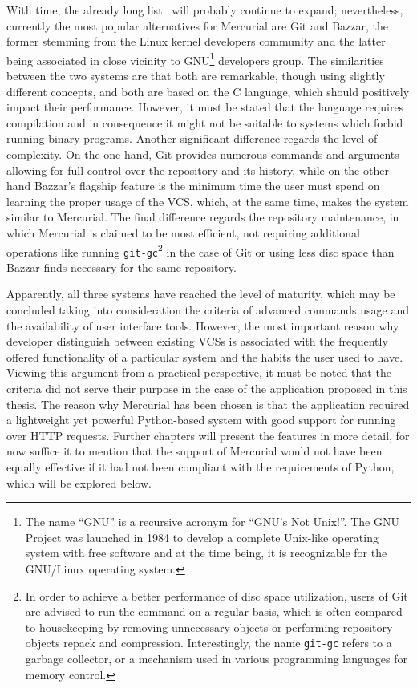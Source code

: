 With time, the already long list~\cite{wiki_dvcs_list} will probably continue to expand; nevertheless, currently the most popular alternatives for Mercurial are Git and Bazzar, the former stemming from the Linux kernel developers community and the latter being associated in close vicinity to GNU\footnote{The name “GNU” is a recursive acronym for “GNU's Not Unix!”. The GNU Project was launched in 1984 to develop a complete Unix-like operating system with free software and at the time being, it is recognizable for the GNU/Linux operating system.} developers group. The similarities between the two systems are that both are remarkable, though using slightly different concepts, and both are based on the C language, which should positively impact their performance. However, it must be stated that the language requires compilation and in consequence it might not be suitable to systems which forbid running binary programs. Another significant difference regards the level of complexity. On the one hand, Git provides numerous commands and arguments allowing for full control over the repository and its history, while on the other hand Bazzar's flagship feature is the minimum time the user must spend on learning the proper usage of the VCS, which, at the same time, makes the system similar to Mercurial. The final difference regards the repository maintenance, in which Mercurial is claimed to be most efficient, not requiring additional operations like running \texttt{git-gc}\footnote{In order to achieve a better performance of disc space utilization, users of Git are advised to run the command on a regular basis, which is often compared to housekeeping by removing unnecessary objects or performing repository objects repack and compression. Interestingly, the name \texttt{git-gc} refers to a garbage collector, or a mechanism used in various programming languages for memory control.} in the case of Git or using less disc space than Bazzar finds necessary for the same repository. 

Apparently, all three systems have reached the level of maturity, which may be concluded taking into consideration the criteria of advanced commands usage and the availability of user interface tools. However, the most important reason why developer distinguish between existing VCSs is associated with the frequently offered functionality of a particular system and the habits the user used to have. Viewing this argument from a practical perspective, it must be noted that the criteria did not serve their purpose in the case of the application proposed in this thesis. The reason why Mercurial has been chosen is that the application required a lightweight yet powerful Python-based system with good support for running over HTTP requests. Further chapters will present the features in more detail, for now suffice it to mention that the support of Mercurial would not have been equally effective if it had not been compliant with the requirements of Python, which will be explored below.

